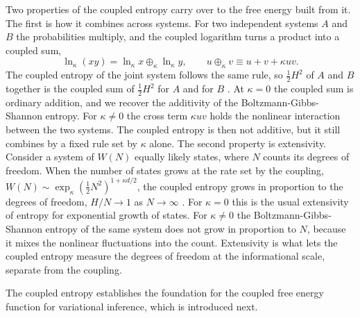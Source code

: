\documentclass[twoside,11pt]{article}
\begin{document}
Two properties of the coupled entropy carry over to the free energy built from it. The first is how it combines across systems. For two independent systems $A$ and $B$ the probabilities multiply, and the coupled logarithm turns a product into a coupled sum,
\begin{equation} \label{coupledSum}
\ln_\kappa(xy)=\ln_\kappa x \oplus_\kappa \ln_\kappa y,
\qquad
u\oplus_\kappa v \equiv u+v+\kappa uv .
\end{equation}
The coupled entropy of the joint system follows the same rule, so $\frac{1}{2}H^2$ of $A$ and $B$ together is the coupled sum of $\frac{1}{2}H^2$ for $A$ and for $B$ \citep{nelsonUniqueUniversalEntropy2026}. At $\kappa=0$ the coupled sum is ordinary addition, and we recover the additivity of the Boltzmann-Gibbs-Shannon entropy. For $\kappa\neq0$ the cross term $\kappa uv$ holds the nonlinear interaction between the two systems. The coupled entropy is then not additive, but it still combines by a fixed rule set by $\kappa$ alone. The second property is extensivity. Consider a system of $W(N)$ equally likely states, where $N$ counts its degrees of freedom. When the number of states grows at the rate set by the coupling, $W(N)\sim\exp_\kappa\left(\frac{1}{2}N^2\right)^{1+\kappa d/2}$, the coupled entropy grows in proportion to the degrees of freedom, $H/N\to1$ as $N\to\infty$ \citep{nelsonUniqueUniversalEntropy2026}. For $\kappa=0$ this is the usual extensivity of entropy for exponential growth of states. For $\kappa\neq0$ the Boltzmann-Gibbs-Shannon entropy of the same system does not grow in proportion to $N$, because it mixes the nonlinear fluctuations into the count. Extensivity is what lets the coupled entropy measure the degrees of freedom at the informational scale, separate from the coupling.

The coupled entropy establishes the foundation for the coupled free energy function for variational inference, which is introduced next.
\end{document}
